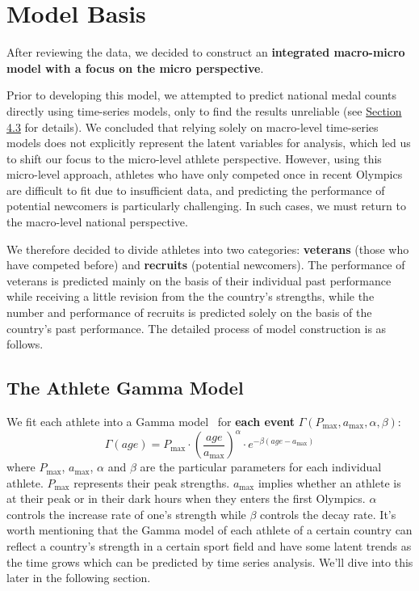\documentclass{mcmthesis}
\begin{document}
\section{Model Basis}

After reviewing the data, we decided to construct an \textbf{integrated macro-micro model with a focus on the micro perspective}.

Prior to developing this model, we attempted to predict national medal counts directly using time-series models, only to find the results unreliable (see \hyperref[sec:4.3]{Section 4.3} for details). We concluded that relying solely on macro-level time-series models does not explicitly represent the latent variables for analysis, which led us to shift our focus to the micro-level athlete perspective. However, using this micro-level approach, athletes who have only competed once in recent Olympics are difficult to fit due to insufficient data, and predicting the performance of potential newcomers is particularly challenging. In such cases, we must return to the macro-level national perspective.

We therefore decided to divide athletes into two categories: \textbf{veterans} (those who have competed before) and \textbf{recruits} (potential newcomers). The performance of veterans is predicted mainly on the basis of their individual past performance while receiving a little revision from the the country's strengths, while the number and performance of recruits is predicted solely on the basis of the country's past performance. The detailed process of model construction is as follows.

\subsection{The Athlete Gamma Model}

We fit each athlete into a Gamma model~\cite{2} for \textbf{each event} $\Gamma(P_{\text{max}}, a_{\text{max}}, \alpha, \beta)$:
\[
\Gamma(age) = P_{\text{max}} \cdot \left( \frac{age}{a_{\text{max}}} \right)^\alpha \cdot e^{-\beta(age-a_{\text{max}})}
\]
where $P_{\text{max}}$, $a_{\text{max}}$, $\alpha$ and $\beta$ are the particular parameters for each individual athlete. $P_{\text{max}}$ represents their peak strengths. $a_{\text{max}}$ implies whether an athlete is at their peak or in their dark hours when they enters the first Olympics.  $\alpha$ controls the increase rate of one's strength while $\beta$ controls the decay rate. It's worth mentioning that the Gamma model of each athlete of a certain country can reflect a country's strength in a certain sport field and have some latent trends as the time grows which can be predicted by time series analysis. We'll dive into this later in the following section.
\end{document}
